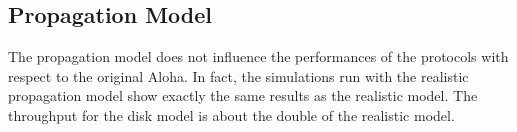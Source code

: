 \subsection{Propagation Model}
The propagation model does not influence the performances of the protocols with respect to the original Aloha.
In fact, the simulations run with the realistic propagation model show exactly the same results as the realistic model.
The throughput for the disk model is about the double of the realistic model.
